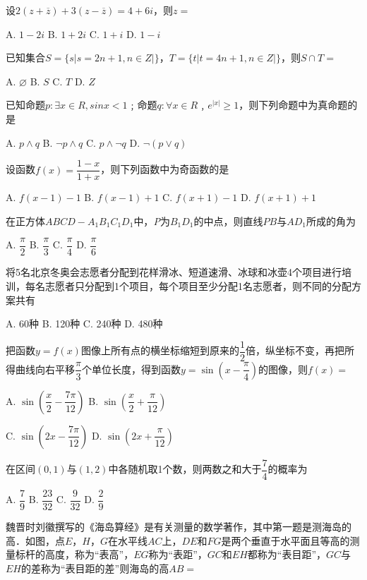 \documentclass[a4paper,11pt]{report}
\begin{document}
\begin{examquestions}

\item 
设$2(z+\overline{z})+3(z-\overline{z})=4+6i$，则$z=$

A.
$1-2i$
B.
$1+2i$
C.
$1+i$
D.
$1-i$

\item 
已知集合$S=\{s|s=2n+1,n\in Z|\}$，$T=\{t|t=4n+1,n\in Z|\}$，则$S\cap T=$

A.
$\varnothing$
B.
$S$
C.
$T$
D.
$Z$

\item 
已知命题$p:∃x\in R,sinx<1$﹔命题$q:∀x\in R$﹐$e^{|x|}\geq1$，则下列命题中为真命题的是

A.
$p∧q$
B.
$¬p∧q$
C.
$p∧¬q$
D.
$¬(p∨q)$

\item 
设函数$f(x)=\dfrac{1-x}{1+x}$，则下列函数中为奇函数的是

A.
$f(x-1)-1$
B.
$f(x-1)+1$
C.
$f(x+1)-1$
D.
$f(x+1)+1$

\item 
在正方体$ABCD-A_{1}B_{1}C_{1}D_{1}$中，\emph{P}为$B_{1}D_{1}$的中点，则直线$PB$与$AD_{1}$所成的角为

A.
$\dfrac{\pi}{2}$
B.
$\dfrac{\pi}{3}$
C.
$\dfrac{\pi}{4}$
D.
$\dfrac{\pi}{6}$

\item 
将5名北京冬奥会志愿者分配到花样滑冰、短道速滑、冰球和冰壶4个项目进行培训，每名志愿者只分配到1个项目，每个项目至少分配1名志愿者，则不同的分配方案共有

A. 60种 B. 120种 C. 240种 D. 480种

\item 
把函数$y=f(x)$图像上所有点的横坐标缩短到原来的$\dfrac{1}{2}$倍，纵坐标不变，再把所得曲线向右平移$\dfrac{\pi}{3}$个单位长度，得到函数$y=\sin(x-\dfrac{\pi}{4})$的图像，则$f(x)=$

A.
$\sin(\dfrac{x}{2}-\dfrac{7\pi}{12})$
B.
$\sin(\dfrac{x}{2}+\dfrac{\pi}{12})$

C.
$\sin(2x-\dfrac{7\pi}{12})$
D.
$\sin(2x+\dfrac{\pi}{12})$

\item 
在区间$(0,1)$与$(1,2)$中各随机取1个数，则两数之和大于$\dfrac{7}{4}$的概率为

A.
$\dfrac{7}{9}$
B.
$\dfrac{23}{32}$
C.
$\dfrac{9}{32}$
D.
$\dfrac{2}{9}$

\item 
魏晋时刘徽撰写的《海岛算经》是有关测量的数学著作，其中第一题是测海岛的高．如图，点$E$，$H$，$G$在水平线$AC$上，$DE$和$FG$是两个垂直于水平面且等高的测量标杆的高度，称为``表高''，$EG$称为``表距''，$GC$和$EH$都称为``表目距''，$GC$与$EH$的差称为``表目距的差''则海岛的高$AB=$


\end{examquestions}
\end{document}
